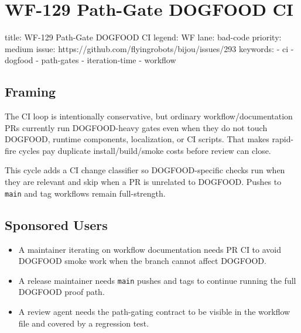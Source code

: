 \chapter{WF-129 Path-Gate DOGFOOD CI}\label{record-211}

\smallskip

\begin{RecordMeta}
title: WF-129 Path-Gate DOGFOOD CI
legend: WF
lane: bad-code
priority: medium
issue: https://github.com/flyingrobots/bijou/issues/293
keywords:
  - ci
  - dogfood
  - path-gates
  - iteration-time
  - workflow

\end{RecordMeta}

\section{Framing}\label{record-211-framing}

The CI loop is intentionally conservative, but ordinary workflow/documentation PRs currently run DOGFOOD-heavy gates even when they do not touch DOGFOOD, runtime components, localization, or CI scripts. That makes rapid-fire cycles pay duplicate install/build/smoke costs before review can close.

This cycle adds a CI change classifier so DOGFOOD-specific checks run when they are relevant and skip when a PR is unrelated to DOGFOOD. Pushes to \texttt{m\allowbreak{}a\allowbreak{}i\allowbreak{}n} and tag workflows remain full-strength.

\section{Sponsored Users}\label{record-211-sponsored-users}

\begin{itemize}
\tightlist
\item
  A maintainer iterating on workflow documentation needs PR CI to avoid DOGFOOD smoke work when the branch cannot affect DOGFOOD.
\item
  A release maintainer needs \texttt{m\allowbreak{}a\allowbreak{}i\allowbreak{}n} pushes and tags to continue running the full DOGFOOD proof path.
\item
  A review agent needs the path-gating contract to be visible in the workflow file and covered by a regression test.
\end{itemize}

